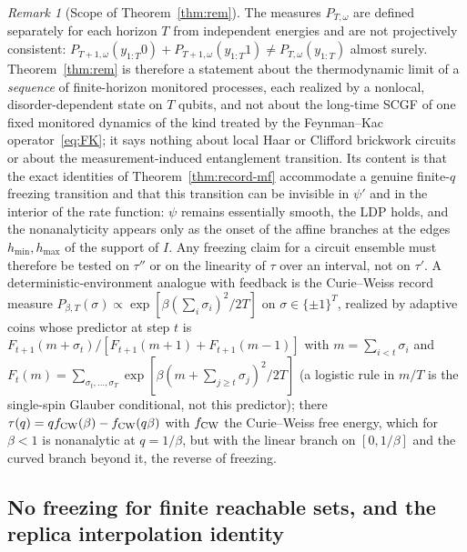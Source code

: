 \documentclass[aps,prx,reprint,superscriptaddress,nobibnotes,longbibliography]{revtex4-2}
\theoremstyle{remark}
\newtheorem{remark}{Remark}
\begin{document}
\begin{remark}[Scope of Theorem~\ref{thm:rem}]
\label{rem:rem-scope}
The measures $P_{T,\omega}$ are defined separately for each horizon $T$ from independent energies and are not projectively consistent: $P_{T+1,\omega}(y_{1:T}0)+P_{T+1,\omega}(y_{1:T}1)\ne P_{T,\omega}(y_{1:T})$ almost surely.  Theorem~\ref{thm:rem} is therefore a statement about the thermodynamic limit of a \emph{sequence} of finite-horizon monitored processes, each realized by a nonlocal, disorder-dependent state on $T$ qubits, and not about the long-time SCGF of one fixed monitored dynamics of the kind treated by the Feynman--Kac operator~\eqref{eq:FK}; it says nothing about local Haar or Clifford brickwork circuits or about the measurement-induced entanglement transition.  Its content is that the exact identities of Theorem~\ref{thm:record-mf} accommodate a genuine finite-$q$ freezing transition and that this transition can be invisible in $\psi'$ and in the interior of the rate function: $\psi$ remains essentially smooth, the LDP holds, and the nonanalyticity appears only as the onset of the affine branches at the edges $h_{\min},h_{\max}$ of the support of $I$.  Any freezing claim for a circuit ensemble must therefore be tested on $\tau''$ or on the linearity of $\tau$ over an interval, not on $\tau'$.  A deterministic-environment analogue with feedback is the Curie--Weiss record measure $P_{\beta,T}(\sigma)\propto\exp[\beta(\sum_i\sigma_i)^2/2T]$ on $\sigma\in\{\pm1\}^T$, realized by adaptive coins whose predictor at step $t$ is $F_{t+1}(m+\sigma_t)/[F_{t+1}(m+1)+F_{t+1}(m-1)]$ with $m=\sum_{i<t}\sigma_i$ and $F_t(m)=\sum_{\sigma_t,\ldots,\sigma_T}\exp[\beta(m+\sum_{j\ge t}\sigma_j)^2/2T]$ (a logistic rule in $m/T$ is the single-spin Glauber conditional, not this predictor); there $\tau(q)=qf_{\rm CW}(\beta)-f_{\rm CW}(q\beta)$ with $f_{\rm CW}$ the Curie--Weiss free energy, which for $\beta<1$ is nonanalytic at $q=1/\beta$, but with the linear branch on $[0,1/\beta]$ and the curved branch beyond it, the reverse of freezing.
\end{remark}



\subsection{No freezing for finite reachable sets, and the replica interpolation identity}
\label{sec:nofreeze}
\end{document}
